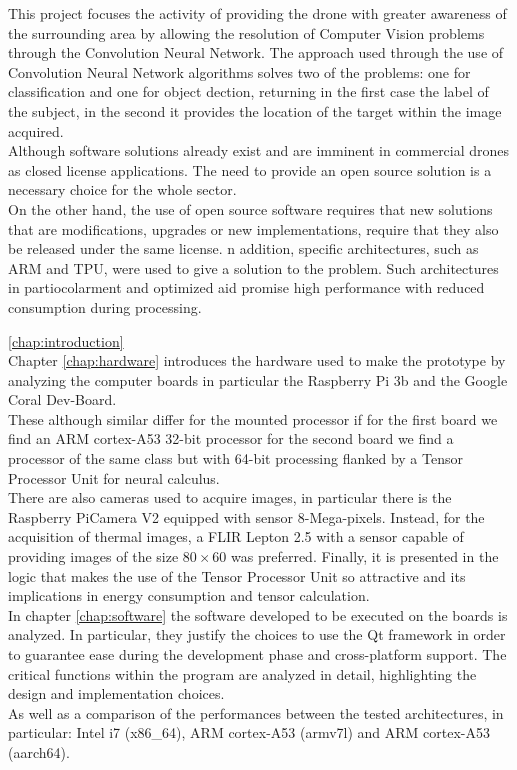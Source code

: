 \noindent This project focuses the activity of providing the drone with greater 
awareness of the surrounding area by allowing the resolution of Computer Vision
problems through the Convolution Neural Network.
The approach used through the use of Convolution Neural Network algorithms
solves two of the problems: one for classification and one for object dection,
returning in the first case the label of the subject, in the second it provides
the location of the target within the image acquired.\\
Although software solutions already exist and are imminent in commercial drones
as closed license applications. The need to provide an open source solution is a
necessary choice for the whole sector.\\
On the other hand, the use of open source software requires that new solutions
that are modifications, upgrades or new implementations, require that they also
be released under the same license. 
n addition, specific architectures, such as ARM and TPU, were used to give a
solution to the problem. Such architectures in partiocolarment and optimized aid
promise high performance with reduced consumption during processing.



\ref{chap:introduction}\\


\noindent Chapter \ref{chap:hardware} introduces the hardware used to make the
prototype by analyzing the computer boards in particular the Raspberry Pi 3b and
the Google Coral Dev-Board.\\
These although similar differ for the mounted processor if for the first board
we find an ARM cortex-A53 32-bit processor for the second board we find a
processor of the same class but with 64-bit processing flanked by a Tensor
Processor Unit for neural calculus.\\
There are also cameras used to acquire images, in particular there is the
Raspberry PiCamera V2 equipped with sensor 8-Mega-pixels. 
Instead, for the acquisition of thermal images, a FLIR Lepton 2.5 with a sensor
capable of providing images of the size $ 80 \times 60 $ was preferred. 
Finally, it is presented in the logic that makes the use of the Tensor Processor
Unit so attractive and its implications in energy consumption and tensor
calculation.\\

\noindent In chapter \ref{chap:software} the software developed to be executed
on the boards is analyzed. 
In particular, they justify the choices to use the Qt framework in
order to guarantee ease during the development phase and cross-platform support.
The critical functions within the program are analyzed in detail, highlighting
the design and implementation choices.\\ 
As well as a comparison of the performances between the tested architectures, in
particular: Intel i7 (x86\_64), ARM cortex-A53 (armv7l) and ARM cortex-A53
(aarch64).\\


